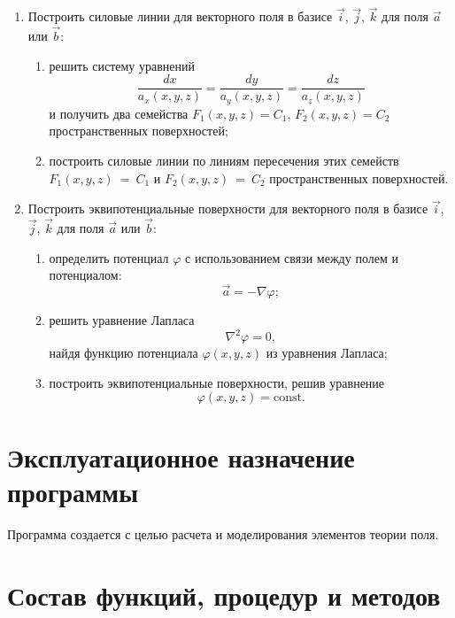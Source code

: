 \documentclass[14pt,a4paper,final]{extreport}
\begin{document}
\begin{enumerate}[label=\arabic*.]
	\item Построить силовые линии для векторного поля в базисе \( \vec i \), \( \vec j \), \( \vec k \) для поля \( \vec a \) или \( \vec b \):
	
	\begin{enumerate}[label=\theenumi\arabic*]
		\item решить систему уравнений \[ \frac{dx}{a_x(x, y, z)} = \frac{dy}{a_y(x, y, z)} = \frac{dz}{a_z(x, y, z)} \]  и получить два семейства \( F_1(x, y, z) = C_1 \), \( F_2(x, y, z) = C_2 \) пространственных поверхностей;
		
		\item построить силовые линии по линиям пересечения этих семейств \( F_1(x, y, z)~=~C_1 \) и \( F_2(x, y, z)~=~C_2 \) пространственных поверхностей.
	\end{enumerate}
	
	\item Построить эквипотенциальные поверхности для векторного поля в базисе \( \vec i \), \( \vec j \), \( \vec k \) для поля \( \vec a \) или \( \vec b \):
	
	\begin{enumerate}[label=\theenumi\arabic*]
		\item определить потенциал \( \varphi \) с использованием связи между полем и потенциалом: \[ \vec a = -\nabla \varphi ;\]
		
		\item решить уравнение Лапласа \[ \nabla^2 \varphi = 0, \]найдя функцию потенциала \( \varphi (x, y, z) \) из уравнения Лапласа;
\pagebreak %
		
		\item построить эквипотенциальные поверхности, решив уравнение \[ \varphi (x, y, z) = \mathrm{const} .\]
	\end{enumerate}
\end{enumerate}

\section{ Эксплуатационное назначение программы}
Программа создается с целью расчета и моделирования элементов теории поля.

\section{ Состав функций, процедур и методов}
\end{document}
